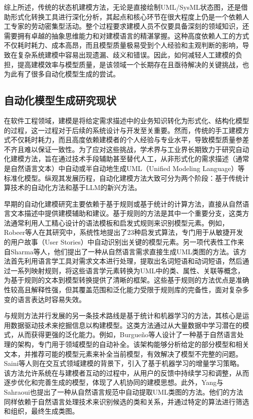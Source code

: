 综上所述，传统的状态机建模方法，无论是直接绘制UML/SysML状态图，还是借助形式化转换工具进行深化分析，其起点和核心环节在很大程度上仍是一个依赖人工专家的劳动密集型活动。整个过程要求建模人员不仅要具备深刻的领域知识，还需要拥有卓越的抽象思维能力和对建模语言的精湛掌握。这种高度依赖人工的方式不仅耗时耗力、成本高昂，而且模型质量极易受到个人经验和主观判断的影响，导致在复杂系统建模中容易出现遗漏、歧义和错误。因此，如何减轻人工建模的负担，提高建模效率与模型质量，是该领域一个长期存在且亟待解决的关键挑战，也为此有了很多自动化模型生成的尝试。


\subsection{自动化模型生成研究现状}

在软件工程领域，建模是将给定需求描述中的业务知识转化为形式化、结构化模型的过程，这一过程对于后续的系统设计与开发至关重要。然而，传统的手工建模方式不仅耗时耗力，而且高度依赖建模者的个人经验与专业水平，导致模型质量参差不齐且难以保证一致性。为了应对这些挑战，学术界与工业界长期致力于研究自动化建模方法，旨在通过技术手段辅助甚至替代人工，从非形式化的需求描述（通常是自然语言文本）中自动或半自动地生成UML（Unified Modeling Language）等标准化模型。纵观其发展历程，自动化建模方法大致可分为两个阶段：基于传统计算技术的自动化方法和基于LLM的新兴方法。

早期的自动化建模研究主要依赖于基于规则或基于统计的计算方法，直接从自然语言文本描述中提供建模辅助和建议。基于规则的方法是其中一个重要分支，这类方法通常利用人工精心设计的语法模板和启发式规则来识别模型元素。例如，Robeer等人在其研究中，系统性地提出了23种启发式算法，专门用于从敏捷开发的用户故事（User Stories）中自动识别出关键的模型元素。另一项代表性工作来自Sharma等人，他们提出了一种从自然语言需求直接生成UML类图的方法。该方法首先利用语言学工具对需求文本进行处理，提取出名词短语和动词短语，然后通过一系列映射规则，将这些语言学元素转换为UML中的类、属性、关联等概念，为基于规则的文本到模型转换提供了清晰的框架。这些基于规则的方法优点是准确性较高且解释性强，但其覆盖范围和泛化能力受限于规则库的完备性，面对复杂多变的语言表达时容易失效。

与规则方法并行发展的另一条技术路线是基于统计和机器学习的方法，其核心是运用数据驱动技术来挖掘信息以构建模型。这类方法通过从大量数据中学习潜在的模式，从而获得更强的泛化能力。例如，Burgueño等人设计了一种基于自然语言处理的架构，专门用于领域模型的自动补全。该架构能够分析给定的部分模型和相关文本，并推荐可能的模型元素来补全当前模型，有效解决了模型不完整的问题。Saini等人则在交互式领域建模的背景下，引入了基于机器学习的增量学习策略。该方法允许系统在与建模者互动的过程中，从用户的反馈中持续学习和调整，从而逐步优化和完善生成的模型，体现了人机协同的建模思想。此外，Yang与Sahraoui也提出了一种从自然语言规范中自动提取UML类图的方法。他们的方法同样依赖于自然语言处理技术来识别候选的类和关系，并通过特定的算法进行筛选和组织，最终生成类图。

